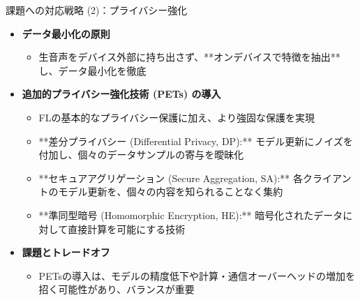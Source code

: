 \documentclass[unicode,12pt,aspectratio=169,dvipdfmx]{beamer}
\begin{document}
\begin{frame}{課題への対応戦略 (2)：プライバシー強化}
\begin{itemize}
    \item \textbf{データ最小化の原則}
    \begin{itemize}
        \item 生音声をデバイス外部に持ち出さず、**オンデバイスで特徴を抽出**し、データ最小化を徹底
    \end{itemize}
    \item \textbf{追加的プライバシー強化技術 (PETs) の導入}
    \begin{itemize}
        \item FLの基本的なプライバシー保護に加え、より強固な保護を実現
        \item **差分プライバシー (Differential Privacy, DP):** モデル更新にノイズを付加し、個々のデータサンプルの寄与を曖昧化
        \item **セキュアアグリゲーション (Secure Aggregation, SA):** 各クライアントのモデル更新を、個々の内容を知られることなく集約
        \item **準同型暗号 (Homomorphic Encryption, HE):** 暗号化されたデータに対して直接計算を可能にする技術
    \end{itemize}
    \item \textbf{課題とトレードオフ}
    \begin{itemize}
        \item PETsの導入は、モデルの精度低下や計算・通信オーバーヘッドの増加を招く可能性があり、バランスが重要
    \end{itemize}
\end{itemize}
\end{frame}
\end{document}
